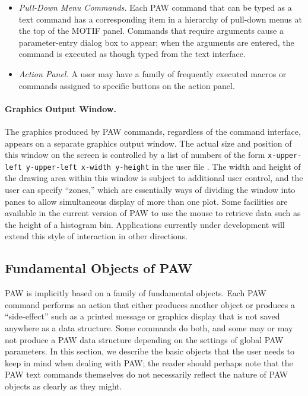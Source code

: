 \begin{itemize}
\item {\it Pull-Down Menu Commands.\/}  Each PAW command that
can be typed as a text command has a corresponding item in
a hierarchy of pull-down menus at the top of the MOTIF panel.
Commands that require arguments cause a parameter-entry
dialog box to appear;  when the arguments are entered, the
command is executed as though typed from the text interface.
\item {\it Action Panel.\/}  A user may have a family of
frequently executed macros or commands assigned to specific
buttons on the action panel.
\end{itemize}
 
\paragraph{Graphics Output Window.}  The graphics produced
by PAW commands, regardless of the command interface, appears
on a separate graphics output window.  The actual size and
position of this window on the screen is controlled by a list
of numbers of the form {\tt x-upper-left y-upper-left x-width y-height}
in the user file .  The width and height
of the drawing area within this window is subject to additional
user control, and the user can specify ``zones,'' which are essentially
ways of dividing the window into panes to allow simultaneous display
of more than one plot.  Some facilities are available in the
current version of PAW to use the mouse to retrieve data such
as the height of a histogram bin.  Applications currently
under development will extend this style of interaction in
other directions.
 
\subsection{Fundamental Objects of PAW}
 
PAW is implicitly based on a family of fundamental objects.
Each PAW command performs an action that either produces
another object or produces a ``side-effect'' such as
a printed message or graphics display that is not saved
anywhere as a data structure.  Some commands do both,
and some may or may not produce a PAW data structure depending
on the settings of global PAW parameters.  In this section,
we describe the basic objects that the user needs to keep
in mind when dealing with PAW;  the reader should perhaps
note that the PAW text commands themselves do not
necessarily reflect the nature of PAW objects as clearly
as they might.
 
